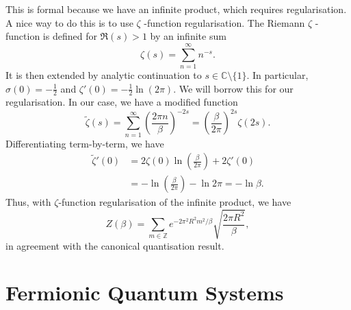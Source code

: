This is formal because we have an infinite product, which requires regularisation.
A nice way to do this is to use $\zeta$ -function regularisation.
The Riemann $\zeta$ -function is defined for $\Re(s) > 1$  by an infinite sum
\begin{equation}
  \zeta(s) = \sum_{n=1}^{\infty} n^{-s}.
\end{equation}
It is then extended by analytic continuation to $s\in \mathbb{C} \setminus \{1\}$.
In particular, $\sigma(0) = -\frac{1}{2}$ and $\zeta'(0) = -\frac{1}{2} \ln(2\pi)$.
We will borrow this for our regularisation.
In our case, we have a modified function
\begin{equation}
  \widetilde{\zeta}(s) = \sum_{n=1}^{\infty} \left( \frac{2\pi n}{\beta} \right)^{-2s} = \left( \frac{\beta}{2\pi} \right)^{2s} \zeta(2s).
\end{equation}
Differentiating term-by-term, we have
\begin{align}
  \widetilde{\zeta}'(0) &= 2 \zeta(0) \ln(\frac{\beta}{2\pi}) + 2 \zeta'(0) \\
			&= -\ln(\frac{\beta}{2\pi})- \ln 2\pi = - \ln \beta.
\end{align}
Thus, with $\zeta$-function regularisation of the infinite product, we have
\begin{equation}
  Z(\beta) = \sum_{m\in \mathbb{Z}} e^{- 2 \pi^2 R^2 m^2 / \beta} \sqrt{\frac{2\pi R^2}{\beta}},
\end{equation}
in agreement with the canonical quantisation result.

\section{Fermionic Quantum Systems}%
\label{sec:fermionic_quantum_systems}


